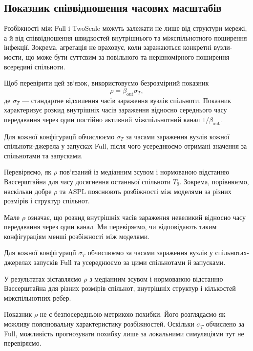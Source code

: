 \documentclass[a4paper,fleqn]{cas-sc}
\begin{document}
\subsection{Показник співвідношення часових масштабів}
\label{sec:descriptor}

Розбіжності між Full і TwoScale можуть залежати
не лише від структури мережі, а й від співвідношення
швидкостей внутрішнього та міжспільнотного
поширення інфекції. Зокрема, агрегація
не враховує, коли заражаються конкретні
вузли-мости, що може бути суттєвим
за повільного та нерівномірного
поширення всередині спільноти.

Щоб перевірити цей зв'язок, використовуємо
безрозмірний показник
\begin{equation}
\label{eq:rho}
\rho=\beta_{\mathrm{out}}\sigma_T,
\end{equation}
де $\sigma_T$ --- стандартне відхилення
часів зараження вузлів спільноти.
Показник характеризує розкид внутрішніх
часів зараження відносно середнього часу
передавання через один постійно активний
міжспільнотний канал $1/\beta_{\mathrm{out}}$.

Для кожної конфігурації обчислюємо
$\sigma_T$ за часами зараження вузлів
кожної спільноти-джерела у запусках Full,
після чого усереднюємо отримані значення
за спільнотами та запусками.

Перевіряємо, як $\rho$ пов'язаний
із медіанним зсувом і нормованою відстанню
Вассерштайна для часу досягнення останньої
спільноти $T_9$. Зокрема, порівнюємо,
наскільки добре $\rho$ та ASPL пояснюють
розбіжності між моделями за різних
розмірів і структур спільнот.

Мале $\rho$ означає, що розкид внутрішніх
часів зараження невеликий відносно часу
передавання через один канал.
Ми перевіряємо, чи відповідають таким
конфігураціям менші розбіжності між моделями.

Для кожної конфігурації $\sigma_T$
обчислюємо за часами зараження вузлів
у спільнотах-джерелах запусків Full
та усереднюємо за цими спільнотами
й запусками.

У результатах зіставляємо $\rho$
з медіанним зсувом і нормованою відстанню
Вассерштайна для різних розмірів спільнот,
внутрішніх структур і кількостей
міжспільнотних ребер.

Показник $\rho$ не є безпосередньою метрикою
похибки. Його розглядаємо як можливу
пояснювальну характеристику розбіжностей.
Оскільки $\sigma_T$ обчислено за Full,
можливість прогнозувати похибку лише
за локальними симуляціями тут не перевіряємо.
\end{document}
